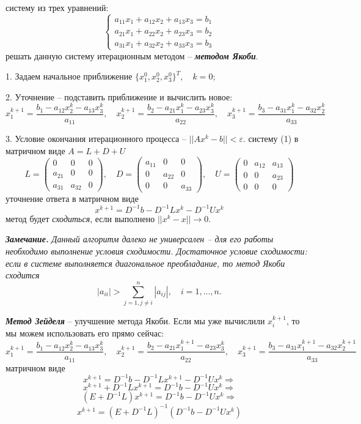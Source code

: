 \documentclass[9pt]{article}
\begin{document}
 систему из трех уравнений:
\begin{equation}
    \left\{
\begin{array}{l}
    a_{11}x_1+a_{12}x_2+a_{13}x_3=b_1\\
    a_{21}x_1+a_{22}x_2+a_{23}x_3=b_2\\
    a_{31}x_1+a_{32}x_2+a_{33}x_3=b_3
\end{array}
\right.
\end{equation}
 решать данную систему итерационным методом -- \textbf{\textit{методом Якоби}}.
\par1. Задаем начальное приближение \(\{x_1^0,x_2^0,x_3^0\}^T,\quad k = 0\);
\par2. Уточнение -- подставить приближение и вычислить новое:
\[x_1^{k+1}=\dfrac{b_1-a_{12}x_2^k-a_{13}x_3^k}{a_{11}},\quad x_2^{k+1}=\dfrac{b_2-a_{21}x_1^k-a_{23}x_3^k}{a_{22}},\quad x_3^{k+1}=\dfrac{b_3-a_{31}x_1^k-a_{32}x_2^k}{a_{33}}\]
\par3. Условие окончания итерационного процесса -- \(||Ax^k-b||<\varepsilon\).
 систему (1) в матричном виде \(A=L+D+U\)
\[L=\left(
\begin{array}{ccc}
    0 & 0 & 0 \\
    a_{21} & 0 & 0 \\
    a_{31} & a_{32} & 0
\end{array}\right),\quad D=\left(
\begin{array}{ccc}
    a_{11} & 0 & 0 \\
    0 & a_{22} & 0 \\
    0 & 0 & a_{33}
\end{array}\right),\quad U=\left(
\begin{array}{ccc}
    0 & a_{12} & a_{13} \\
    0 & 0 & a_{23} \\
    0 & 0 & 0
\end{array}\right)\]
 уточнение ответа в матричном виде
\[x^{k+1}=D^{-1}b-D^{-1}Lx^k-D^{-1}Ux^k\]
 метод будет \textit{сходиться}, если выполнено \(||x^k-x||\to0\).
\par\textit{\textbf{Замечание.}} \textit{Данный алгоритм далеко не универсален -- для его работы необходимо выполнение условия сходимости. Достаточное условие сходимости: если в системе выполняется диагональное преобладание, то метод Якоби сходится}\[|a_{ii}|>\displaystyle\sum^n_{j=1,j\neq i}|a_{ij}|,\quad i=1,...,n.\]
\par\textbf{\textit{Метод Зейделя}} -- улучшение метода Якоби. Если мы уже вычислили \(x_i^{k+1}\), то мы можем использовать его прямо сейчас:
\[x_1^{k+1}=\dfrac{b_1-a_{12}x_2^k-a_{13}x_3^k}{a_{11}},\quad x_2^{k+1}=\dfrac{b_2-a_{21}x_1^{k+1}-a_{23}x_3^k}{a_{22}},\quad x_3^{k+1}=\dfrac{b_3-a_{31}x_1^{k+1}-a_{32}x_2^{k+1}}{a_{33}}\]
 матричном виде
\[x^{k+1}=D^{-1}b-D^{-1}Lx^{k+1}-D^{-1}Ux^k \Rightarrow\]
\[x^{k+1}+D^{-1}Lx^{k+1}=D^{-1}b-D^{-1}Ux^k \Rightarrow\]
\[(E+D^{-1}L)x^{k+1}=D^{-1}b-D^{-1}Ux^k\Rightarrow\]
\[x^{k+1}=(E+D^{-1}L)^{-1}(D^{-1}b-D^{-1}Ux^k)\]
\end{document}
